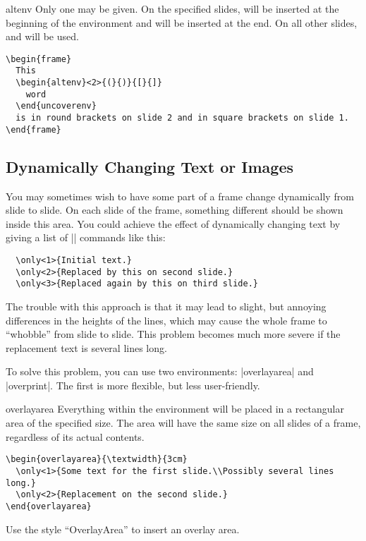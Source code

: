\begin{environment}{{altenv}}
  Only one  may be given. On the specified
  slides,  will be inserted at the beginning of the
  environment and  will be inserted at the end. On all
  other slides,  and  will be used.

  \example
\begin{verbatim}
\begin{frame}
  This
  \begin{altenv}<2>{(}{)}{[}{]}
    word
  \end{uncoverenv}
  is in round brackets on slide 2 and in square brackets on slide 1.
\end{frame}
\end{verbatim}
\end{environment}


\subsection{Dynamically Changing Text or Images}

You may sometimes wish to have some part of a frame change dynamically
from slide to slide. On each slide of the frame, something different
should be shown inside this area. You could achieve the effect of
dynamically changing text by giving a list of |\only| commands like this:
\begin{verbatim}
  \only<1>{Initial text.}
  \only<2>{Replaced by this on second slide.}
  \only<3>{Replaced again by this on third slide.}
\end{verbatim}
The trouble with this approach is that it may lead to slight, but
annoying differences in the heights of the lines, which may cause the
whole frame to ``whobble'' from slide to slide. This problem becomes
much more severe if the replacement text is several lines long.

To solve this problem, you can use two environments:
|overlayarea| and |overprint|. The first is more flexible,
but less user-friendly.

\begin{environment}{{overlayarea}}
  Everything within the environment will be placed in a rectangular
  area of the specified size. The area will have the same size on all
  slides of a frame, regardless of its actual contents.
  \example
\begin{verbatim}
\begin{overlayarea}{\textwidth}{3cm}
  \only<1>{Some text for the first slide.\\Possibly several lines long.}
  \only<2>{Replacement on the second slide.}
\end{overlayarea}
\end{verbatim}

  \lyxnote
  Use the style ``OverlayArea'' to insert an overlay area.
\end{environment}

